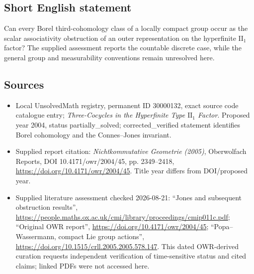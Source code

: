 \documentclass[11pt]{article}
\begin{document}
\subsection{Short English statement}
Can every Borel third-cohomology class of a locally compact group occur as the scalar associativity obstruction of an outer representation on the hyperfinite $\mathrm{II}_1$ factor? The supplied assessment reports the countable discrete case, while the general group and measurability conventions remain unresolved here.
\subsection{Sources}
\begin{itemize}
\item Local UnsolvedMath registry, permanent ID 30000132, exact source code catalogue entry; \emph{Three-Cocycles in the Hyperfinite Type $\mathrm{II}_1$ Factor}. Proposed year 2004, status partially\_solved; corrected\_verified statement identifies Borel cohomology and the Connes--Jones invariant.
\item Supplied report citation: \emph{Nichtkommutative Geometrie (2005)}, Oberwolfach Reports, DOI 10.4171/owr/2004/45, pp. 2349--2418, \url{https://doi.org/10.4171/owr/2004/45}. Title year differs from DOI/proposed year.
\item Supplied literature assessment checked 2026-08-21: ``Jones and subsequent obstruction results'', \url{https://people.maths.ox.ac.uk/cmi/library/proceedings/cmip011c.pdf}; ``Original OWR report'', \url{https://doi.org/10.4171/owr/2004/45}; ``Popa--Wassermann, compact Lie group actions'', \url{https://doi.org/10.1515/crll.2005.2005.578.147}. This dated OWR-derived curation requests independent verification of time-sensitive status and cited claims; linked PDFs were not accessed here.
\end{itemize}
\end{document}
